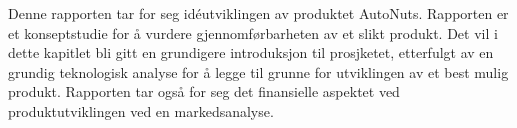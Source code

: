 Denne rapporten tar for seg idéutviklingen av produktet AutoNuts. Rapporten er 
et konseptstudie for å vurdere gjennomførbarheten av et slikt produkt. Det vil 
i dette kapitlet bli gitt en grundigere introduksjon til prosjketet, etterfulgt 
av en grundig teknologisk analyse for å legge til grunne for utviklingen 
av et best mulig produkt. Rapporten tar også for seg det finansielle aspektet ved 
produktutviklingen ved en markedsanalyse.
